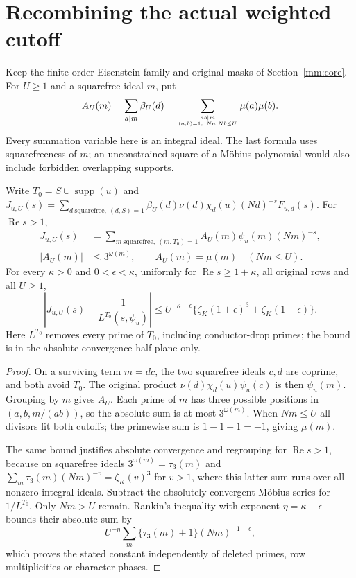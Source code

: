 \section{Recombining the actual weighted cutoff}
\label{rc:core}
Keep the finite-order Eisenstein family and original masks of
Section~\ref{mm:core}. For $U\ge1$ and a squarefree ideal $m$, put
\[
 A_U(m)=\sum_{d\mid m}\beta_U(d)
 =\sum_{ab\mid m\atop(a,b)=1,\ Na,Nb\le U}\mu(a)\mu(b).
\]
Every summation variable here is an integral ideal. The last formula
uses squarefreeness of $m$; an unconstrained square of a M\"obius
polynomial would also include forbidden overlapping supports.
\begin{theorem}
\label{rc:recombination}
Write $T_0=S\cup\operatorname{supp}(u)$ and
$J_{u,U}(s)=\sum_{d\ \mathrm{squarefree},\ (d,S)=1}
\beta_U(d)\nu(d)\chi_d(u)(Nd)^{-s}F_{u,d}(s)$.
For $\operatorname{Re}s>1$,
\begin{align*}
 J_{u,U}(s)&=\sum_{m\ \mathrm{squarefree},\ (m,T_0)=1}
                   A_U(m)\psi_u(m)(Nm)^{-s},\\
 |A_U(m)|&\le3^{\omega(m)},\qquad
 A_U(m)=\mu(m)\quad(Nm\le U).
\end{align*}
For every $\kappa>0$ and $0<\epsilon<\kappa$, uniformly for
$\operatorname{Re}s\ge1+\kappa$, all original rows and all $U\ge1$,
\[
 \left|J_{u,U}(s)-\frac1{L^{T_0}(s,\psi_u)}\right|
 \le U^{-\kappa+\epsilon}
 \{\zeta_K(1+\epsilon)^3+\zeta_K(1+\epsilon)\}.
\]
Here $L^{T_0}$ removes every prime of $T_0$, including conductor-drop
primes; the bound is in the absolute-convergence half-plane only.
\end{theorem}
\begin{proof}
On a surviving term $m=dc$, the two squarefree ideals $c,d$ are
coprime, and both avoid $T_0$. The original product
$\nu(d)\chi_d(u)\psi_u(c)$ is then $\psi_u(m)$. Grouping by $m$
gives $A_U$. Each prime of $m$ has three possible positions in
$(a,b,m/(ab))$, so the absolute sum is at most $3^{\omega(m)}$.
When $Nm\le U$ all divisors fit both cutoffs; the primewise sum is
$1-1-1=-1$, giving $\mu(m)$.

The same bound justifies absolute convergence and regrouping for
$\operatorname{Re}s>1$, because on squarefree ideals
$3^{\omega(m)}=\tau_3(m)$ and
$\sum_m\tau_3(m)(Nm)^{-v}=\zeta_K(v)^3$ for $v>1$,
where this latter sum runs over all nonzero integral ideals.
Subtract the absolutely convergent M\"obius series for $1/L^{T_0}$.
Only $Nm>U$ remain. Rankin's inequality with exponent
$\eta=\kappa-\epsilon$ bounds their absolute sum by
\[
 U^{-\eta}\sum_m\{\tau_3(m)+1\}
                  (Nm)^{-1-\epsilon},
\]
which proves the stated constant independently of deleted primes,
row multiplicities or character phases.
\end{proof}

